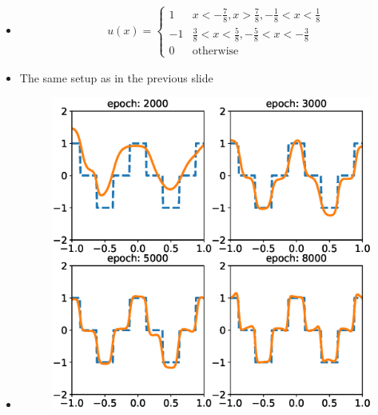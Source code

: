 \documentclass{beamer}
\begin{document}
\begin{frame}

	\begin{itemize}
	\item[] \begin{align*}
	&u(x) = \left\{\begin{matrix}
	1   & x < -\frac{7}{8}, x> \frac{7}{8}, -\frac{1}{8}<x<\frac{1}{8}\\
	-1  & \frac{3}{8}< x< \frac{5}{8} , -\frac{5}{8}< x<- \frac{3}{8}\\
	0 & \text{otherwise} 
	\end{matrix} \right.
	\end{align*}
	\item[] The same setup as in the previous slide
	\item[] \begin{figure}[ht]
		\centering
		\includegraphics[width=0.7\linewidth]{Figure//Fprinciple_exm2}
	\end{figure}		
	\end{itemize}

\end{frame}
\end{document}
